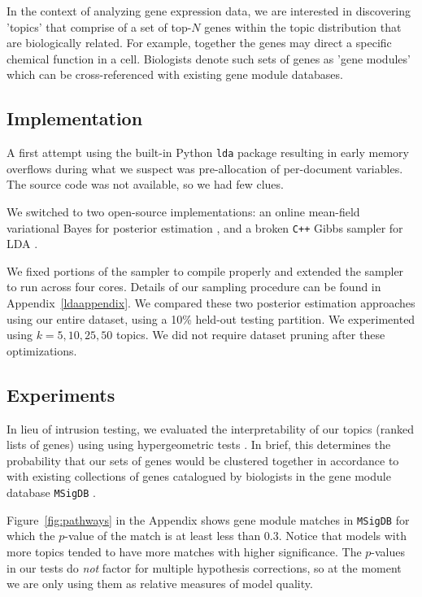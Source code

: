 \documentclass{article}
\begin{document}
In the context of analyzing gene expression data, we are interested in discovering 'topics' that comprise of a set of top-$N$ genes within the topic distribution that are biologically related. For example, together the genes may direct a specific chemical function in a cell. Biologists denote such sets of genes as 'gene modules' which can be cross-referenced with existing gene module databases.

\subsection{Implementation} 
A first attempt using the built-in Python \texttt{lda} package resulting in early memory overflows during what we suspect was pre-allocation of per-document variables. The source code was not available, so we had few clues.

We switched to two open-source implementations: an online mean-field variational Bayes for posterior estimation \cite{ovb}, and a broken \texttt{C++} Gibbs sampler for LDA \cite{plda}. 

\nocite{online}

We fixed portions of the sampler to compile properly and extended the sampler to run across four cores. Details of our sampling procedure can be found in Appendix~\ref{ldaappendix}. We compared these two posterior estimation approaches using our entire dataset, using a 10\% held-out testing partition. We experimented using $k=5, 10, 25, 50$ topics. We did not require dataset pruning after these optimizations.

\subsection{Experiments} 
In lieu of intrusion testing, we evaluated the interpretability of our topics (ranked lists of genes) using using hypergeometric tests \cite{hg}. In brief, this determines the probability that our sets of genes would be clustered together in accordance to with existing collections of genes catalogued by biologists in the gene module database \texttt{MSigDB} \cite{msigdb}.

Figure~\ref{fig:pathways} in the Appendix shows gene module matches in \texttt{MSigDB} for which the $p$-value of the match is at least less than 0.3. Notice that models with more topics tended to have more matches with higher significance. The $p$-values in our tests do \textit{not} factor for multiple hypothesis corrections, so at the moment we are only using them as relative measures of model quality.
\end{document}
